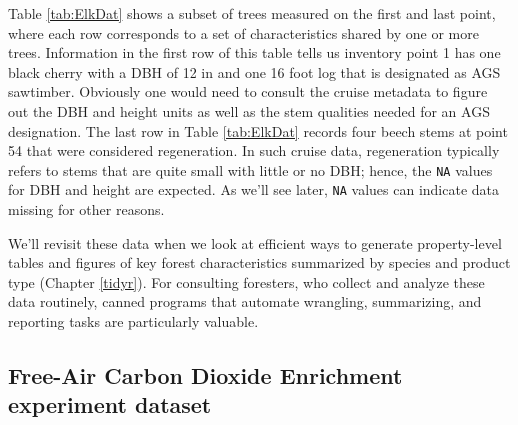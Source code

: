 \documentclass[
  11pt,
]{krantz}
\theoremstyle{definition}
\theoremstyle{definition}
\theoremstyle{definition}
\theoremstyle{definition}
\theoremstyle{remark}
\begin{document}
Table \ref{tab:ElkDat} shows a subset of trees measured on the first and last point, where each row corresponds to a set of characteristics shared by one or more trees. Information in the first row of this table tells us inventory point 1 has one black cherry with a DBH of 12 in and one 16 foot log that is designated as AGS sawtimber. Obviously one would need to consult the cruise metadata to figure out the DBH and height units as well as the stem qualities needed for an AGS designation. The last row in Table \ref{tab:ElkDat} records four beech stems at point 54 that were considered regeneration. In such cruise data, regeneration typically refers to stems that are quite small with little or no DBH; hence, the \texttt{NA} values for DBH and height are expected. As we'll see later, \texttt{NA} values can indicate data missing for other reasons.

We'll revisit these data when we look at efficient ways to generate property-level tables and figures of key forest characteristics summarized by species and product type (Chapter \ref{tidyr}). For consulting foresters, who collect and analyze these data routinely, canned programs that automate wrangling, summarizing, and reporting tasks are particularly valuable.

\hypertarget{face}{%
\subsection{Free-Air Carbon Dioxide Enrichment experiment dataset}\label{face}}
\end{document}
